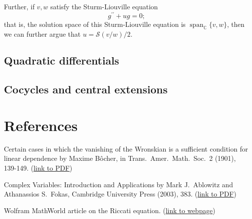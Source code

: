 \documentclass[11pt,leqno]{article}
\theoremstyle{plain}
\theoremstyle{definition}
\numberwithin{equation}{section}
\numberwithin{lem}{section}
\DeclareMathOperator{\Span}{span}
\begin{document}
Further, if $v,w$ satisfy the Sturm-Liouville equation
\[g^{\prime\prime} + ug = 0;\]
that is, the solution space of this Sturm-Liouville equation is $\Span_{\mathbb C}\{v,w\}$, then we can further argue that $u = \mathscr S(v/w)/2$.

\subsection{Quadratic differentials}
\subsection{Cocycles and central extensions}

\newpage\section*{References}

Certain cases in which the vanishing of the Wronskian is a sufficient condition for linear dependence by Maxime B\^ocher, in Trans.~Amer.~Math.~Soc.~2 (1901), 139-149. (\href{https://www.ams.org/journals/tran/1901-002-02/S0002-9947-1901-1500560-5/S0002-9947-1901-1500560-5.pdf}{link to PDF})

Complex Variables: Introduction and Applications by Mark J.~Ablowitz and Athanassios S.~Fokas, Cambridge University Press (2003), 383. (\href{https://ftfsite.ru/wp-content/files/tfkp_endlish_2.2.pdf}{link to PDF})

Wolfram MathWorld article on the Riccati equation. (\href{https://mathworld.wolfram.com/RiccatiDifferentialEquation.html}{link to webpage})
\end{document}
